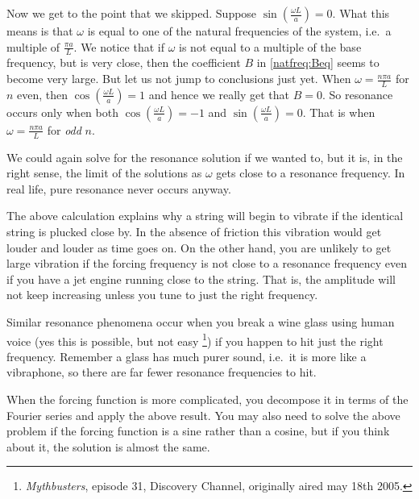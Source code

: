 \documentclass[12pt]{book}
\begin{document}
Now we get to the point that we skipped.  Suppose 
$\sin ( \frac{\omega L}{a} ) = 0$.  What this means is that
$\omega$ is equal to one of the natural frequencies of the system,
i.e.\ a multiple of $\frac{\pi a}{L}$.  We notice that if $\omega$
is not equal to a multiple of the base frequency, but is very close,
then the coefficient $B$ in \eqref{natfreq:Beq} seems to
become very large.  But let us not jump to conclusions just yet.
When $\omega = \frac{n \pi a}{L}$
for $n$ even, then $\cos (\frac{\omega L}{a}) = 1$ and hence we really get that
$B=0$.  So resonance occurs only when 
both $\cos (\frac{\omega L}{a}) = -1$ and
$\sin (\frac{\omega L}{a}) = 0$.  That is when $\omega = \frac{n \pi a }{L}$
for \emph{odd} $n$.

We could again solve for the resonance solution if we wanted to, but it is, in the right sense, the limit of the solutions as $\omega$ gets
close to a resonance frequency.
In real life, pure resonance never occurs anyway.

The above calculation explains why a string will begin to vibrate if the
identical string is plucked close by.  In the absence of friction this vibration
would get louder and louder as time goes on.
On the other hand, you are unlikely to get large vibration if the forcing 
frequency is not close to a resonance frequency even if you have a jet engine
running close to
the string.  That is, the amplitude will not keep
increasing unless you tune to just the right frequency.

Similar resonance phenomena occur when you break a wine glass using human
voice (yes
this is possible, but not easy%
\footnote{\emph{Mythbusters}, episode 31, Discovery Channel, originally aired
may 18th 2005.}) if you happen to hit just the right
frequency.  Remember a glass has much purer sound, i.e.\ it is more like a
vibraphone, so there are far fewer resonance frequencies to hit.

When the forcing function is more complicated, you decompose it in terms of
the Fourier series and apply the above result.  You may also need to solve
the above problem if the forcing function is a sine rather than a cosine,
but if you think about it, the solution is almost the same.
\end{document}
